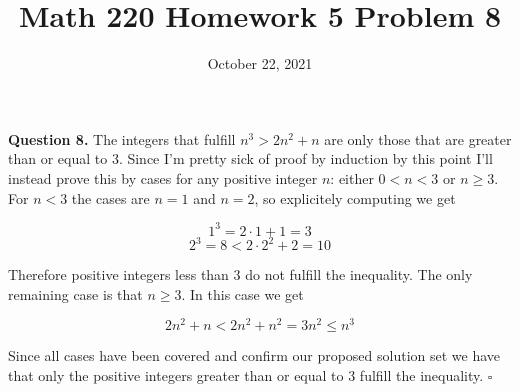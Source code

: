 \documentclass[letterpaper, reqno,11pt]{article}
\begin{document}
\title{Math 220 Homework 5 Problem 8}
\date{October 22, 2021}
\maketitle

{\noindent\bf Question 8.} The integers that fulfill $n^3>2n^2+n$ are only those that are greater than or equal to 3. Since I'm pretty sick of proof by induction by this point I'll instead prove this by cases for any positive integer $n$: either $0<n<3$ or $n\geq 3$. For $n<3$ the cases are $n=1$ and $n=2$, so explicitely computing we get 

$$
    1^3=2\cdot 1+1=3
$$
$$
    2^3=8<2\cdot 2^2+2=10
$$

Therefore positive integers less than $3$ do not fulfill the inequality. The only remaining case is that $n\geq3$. In this case we get 

$$
    2n^2+n<2n^2+n^2=3n^2\leq n^3
$$

Since all cases have been covered and confirm our proposed solution set we have that only the positive integers greater than or equal to 3 fulfill the inequality. $\square$
\end{document}
